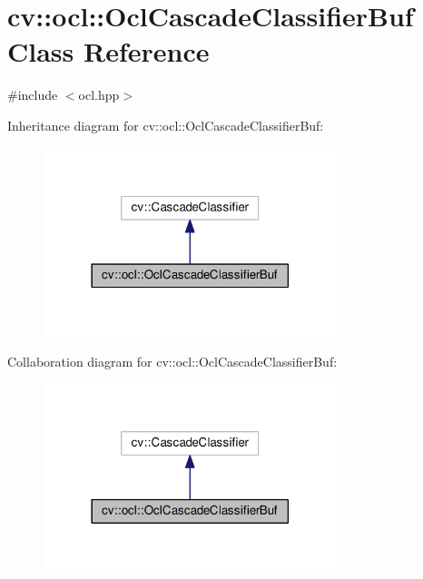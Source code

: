 \hypertarget{classcv_1_1ocl_1_1OclCascadeClassifierBuf}{\section{cv\-:\-:ocl\-:\-:Ocl\-Cascade\-Classifier\-Buf Class Reference}
\label{classcv_1_1ocl_1_1OclCascadeClassifierBuf}
}


{\ttfamily \#include $<$ocl.\-hpp$>$}



Inheritance diagram for cv\-:\-:ocl\-:\-:Ocl\-Cascade\-Classifier\-Buf\-:\nopagebreak
\begin{figure}[H]
\begin{center}
\leavevmode
\includegraphics[width=242pt]{classcv_1_1ocl_1_1OclCascadeClassifierBuf__inherit__graph}
\end{center}
\end{figure}


Collaboration diagram for cv\-:\-:ocl\-:\-:Ocl\-Cascade\-Classifier\-Buf\-:\nopagebreak
\begin{figure}[H]
\begin{center}
\leavevmode
\includegraphics[width=242pt]{classcv_1_1ocl_1_1OclCascadeClassifierBuf__coll__graph}
\end{center}
\end{figure}
